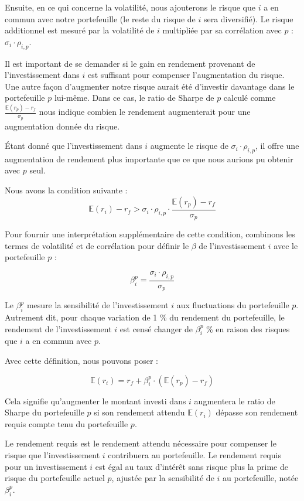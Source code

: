 \documentclass[a4paper, 12pt]{report}
\begin{document}
Ensuite, en ce qui concerne la volatilité, nous ajouterons le risque que \( i \) a en commun avec notre portefeuille (le reste du risque de \( i \) sera diversifié). Le risque additionnel est mesuré par la volatilité de \( i \) multipliée par sa corrélation avec \( p \) : \( \sigma_i \cdot \rho_{i,p} \).

Il est important de se demander si le gain en rendement provenant de l'investissement dans \( i \) est suffisant pour compenser l'augmentation du risque. Une autre façon d'augmenter notre risque aurait été d'investir davantage dans le portefeuille \( p \) lui-même. Dans ce cas, le ratio de Sharpe de \( p \) calculé comme \( \frac{\mathbb{E}(r_p) - r_f}{\sigma_p} \) nous indique combien le rendement augmenterait pour une augmentation donnée du risque.

Étant donné que l'investissement dans \( i \) augmente le risque de \( \sigma_i \cdot \rho_{i,p} \), il offre une augmentation de rendement plus importante que ce que nous aurions pu obtenir avec \( p \) seul.

Nous avons la condition suivante : 
\[
\mathbb{E}(r_i) - r_f > \sigma_i \cdot \rho_{i,p} \cdot \frac{\mathbb{E}(r_p) - r_f}{\sigma_p} 
\]

Pour fournir une interprétation supplémentaire de cette condition, combinons les termes de volatilité et de corrélation pour définir le \(\beta\) de l'investissement \( i \) avec le portefeuille \( p \) :

\[
\beta^p_i = \frac{\sigma_i \cdot \rho_{i,p}}{\sigma_p}
\]

Le \(\beta^p_i\) mesure la sensibilité de l'investissement \( i \) aux fluctuations du portefeuille \( p \). Autrement dit, pour chaque variation de 1 \% du rendement du portefeuille, le rendement de l'investissement \( i \) est censé changer de \(\beta^p_i\) \% en raison des risques que \( i \) a en commun avec \( p \).

Avec cette définition, nous pouvons poser :

\[
\mathbb{E}(r_i) = r_f + \beta^p_i \cdot (\mathbb{E}(r_p) - r_f)
\]

Cela signifie qu'augmenter le montant investi dans \( i \) augmentera le ratio de Sharpe du portefeuille \( p \) si son rendement attendu \( \mathbb{E}(r_i) \) dépasse son rendement requis compte tenu du portefeuille \( p \).

Le rendement requis est le rendement attendu nécessaire pour compenser le risque que l'investissement \( i \) contribuera au portefeuille. Le rendement requis pour un investissement \( i \) est égal au taux d'intérêt sans risque plus la prime de risque du portefeuille actuel \( p \), ajustée par la sensibilité de \( i \) au portefeuille, notée \( \beta^p_i \).
\end{document}

